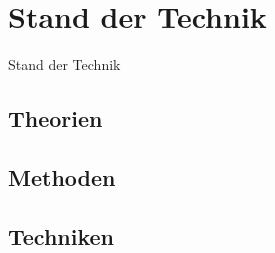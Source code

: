 \chapter{Stand der Technik}
Stand der Technik
\section{Theorien}
\section{Methoden}
\section{Techniken}

